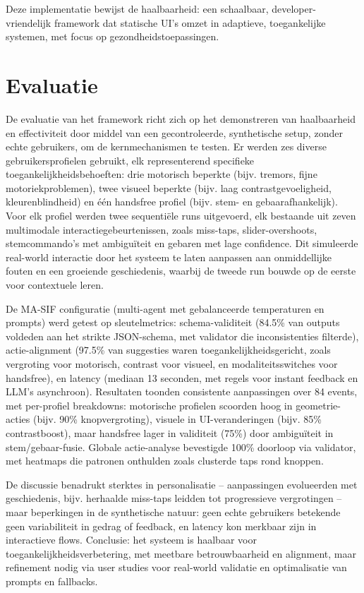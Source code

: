 \documentclass[openany]{book}
\begin{document}
Deze implementatie bewijst de haalbaarheid: een schaalbaar, developer-vriendelijk framework dat statische UI's omzet in adaptieve, toegankelijke systemen, met focus op gezondheidstoepassingen.

\section*{Evaluatie}
De evaluatie van het framework richt zich op het demonstreren van haalbaarheid en effectiviteit door middel van een gecontroleerde, synthetische setup, zonder echte gebruikers, om de kernmechanismen te testen. Er werden zes diverse gebruikersprofielen gebruikt, elk representerend specifieke toegankelijkheidsbehoeften: drie motorisch beperkte (bijv. tremors, fijne motoriekproblemen), twee visueel beperkte (bijv. laag contrastgevoeligheid, kleurenblindheid) en één handsfree profiel (bijv. stem- en gebaarafhankelijk). Voor elk profiel werden twee sequentiële runs uitgevoerd, elk bestaande uit zeven multimodale interactiegebeurtenissen, zoals miss-taps, slider-overshoots, stemcommando's met ambiguïteit en gebaren met lage confidence. Dit simuleerde real-world interactie door het systeem te laten aanpassen aan onmiddellijke fouten en een groeiende geschiedenis, waarbij de tweede run bouwde op de eerste voor contextuele leren.

De MA-SIF configuratie (multi-agent met gebalanceerde temperaturen en prompts) werd getest op sleutelmetrics: schema-validiteit (84.5\% van outputs voldeden aan het strikte JSON-schema, met validator die inconsistenties filterde), actie-alignment (97.5\% van suggesties waren toegankelijkheidsgericht, zoals vergroting voor motorisch, contrast voor visueel, en modaliteitsswitches voor handsfree), en latency (mediaan 13 seconden, met regels voor instant feedback en LLM's asynchroon). Resultaten toonden consistente aanpassingen over 84 events, met per-profiel breakdowns: motorische profielen scoorden hoog in geometrie-acties (bijv. 90\% knopvergroting), visuele in UI-veranderingen (bijv. 85\% contrastboost), maar handsfree lager in validiteit (75\%) door ambiguïteit in stem/gebaar-fusie. Globale actie-analyse bevestigde 100\% doorloop via validator, met heatmaps die patronen onthulden zoals clusterde taps rond knoppen.

De discussie benadrukt sterktes in personalisatie – aanpassingen evolueerden met geschiedenis, bijv. herhaalde miss-taps leidden tot progressieve vergrotingen – maar beperkingen in de synthetische natuur: geen echte gebruikers betekende geen variabiliteit in gedrag of feedback, en latency kon merkbaar zijn in interactieve flows. Conclusie: het systeem is haalbaar voor toegankelijkheidsverbetering, met meetbare betrouwbaarheid en alignment, maar refinement nodig via user studies voor real-world validatie en optimalisatie van prompts en fallbacks.
\end{document}
